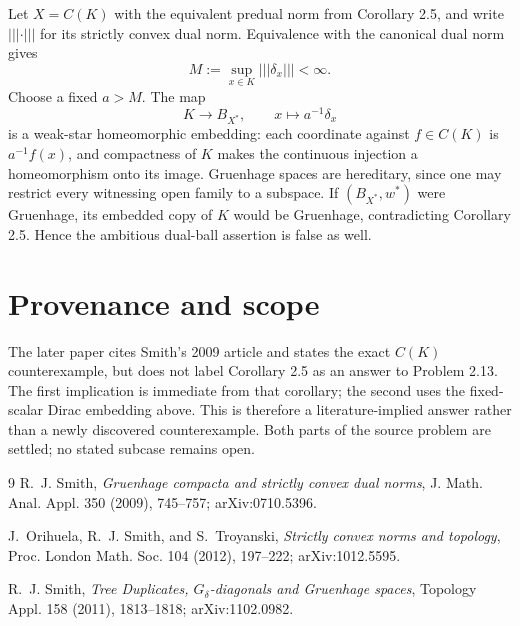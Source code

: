 \documentclass[11pt]{article}
\begin{document}
Let $X=C(K)$ with the equivalent predual norm from Corollary 2.5, and write
$\vert\!\vert\!\vert\cdot\vert\!\vert\!\vert$ for its strictly convex dual
norm.  Equivalence with the canonical dual norm gives
\[
 M:=\sup_{x\in K}\vert\!\vert\!\vert\delta_x\vert\!\vert\!\vert<\infty.
\]
Choose a fixed $a>M$.  The map
\[
 K\longrightarrow B_{X^*},\qquad x\longmapsto a^{-1}\delta_x
\]
is a weak-star homeomorphic embedding: each coordinate against $f\in C(K)$
is $a^{-1}f(x)$, and compactness of $K$ makes the continuous injection a
homeomorphism onto its image.  Gruenhage spaces are hereditary, since one may
restrict every witnessing open family to a subspace.  If $(B_{X^*},w^*)$
were Gruenhage, its embedded copy of $K$ would be Gruenhage, contradicting
Corollary 2.5.  Hence the ambitious dual-ball assertion is false as well.

\section*{Provenance and scope}

The later paper cites Smith's 2009 article and states the exact $C(K)$
counterexample, but does not label Corollary 2.5 as an answer to Problem 2.13.
The first implication is immediate from that corollary; the second uses the
fixed-scalar Dirac embedding above.  This is therefore a literature-implied
answer rather than a newly discovered counterexample.  Both parts of the
source problem are settled; no stated subcase remains open.

\begin{thebibliography}{9}
R.~J. Smith,
\emph{Gruenhage compacta and strictly convex dual norms},
J. Math. Anal. Appl. 350 (2009), 745--757; arXiv:0710.5396.

J.~Orihuela, R.~J. Smith, and S.~Troyanski,
\emph{Strictly convex norms and topology},
Proc. London Math. Soc. 104 (2012), 197--222; arXiv:1012.5595.

R.~J. Smith,
\emph{Tree Duplicates, $G_\delta$-diagonals and Gruenhage spaces},
Topology Appl. 158 (2011), 1813--1818; arXiv:1102.0982.
\end{thebibliography}
\end{document}
